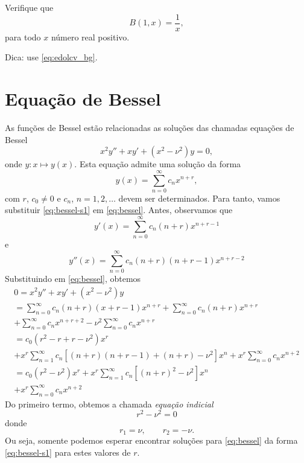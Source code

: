 \begin{exer}
  Verifique que
  \begin{equation}
    B(1,x) = \frac{1}{x},
  \end{equation}
  para todo $x$ número real positivo.
\end{exer}
\begin{resp}
  Dica: use \eqref{eq:edolcv_bg}.
\end{resp}

\section{Equação de Bessel}\label{cap_edolcv_sec_fbessel}

As funções de Bessel estão relacionadas as soluções das chamadas equações de Bessel
\begin{equation}\label{eq:bessel}
  x^2y'' + xy' + (x^2-\nu^2)y = 0,
\end{equation}
onde $y:x\mapsto y(x)$. Esta equação admite uma solução da forma
\begin{equation}\label{eq:bessel-s1}
  y(x) = \sum_{n=0}^\infty c_nx^{n+r},
\end{equation}
com $r$, $c_0\neq 0$ e $c_n$, $n=1,2,\ldots$ devem ser determinados. Para tanto, vamos substituir \eqref{eq:bessel-s1} em \eqref{eq:bessel}. Antes, observamos que
\begin{equation}
  y'(x) = \sum_{n=0}^\infty c_n(n+r)x^{n+r-1}
\end{equation}
e
\begin{equation}
  y''(x) = \sum_{n=0}^\infty c_n(n+r)(n+r-1)x^{n+r-2}
\end{equation}
Substituindo em \eqref{eq:bessel}, obtemos
\begin{gather}
  0 = x^2y'' + xy' + (x^2-\nu^2)y \\
  = \sum_{n=0}^\infty c_n(n+r)(x+r-1)x^{n+r} + \sum_{n=0}^\infty c_n(n+r)x^{n+r} \\
  + \sum_{n=0}^\infty c_nx^{n+r+2}- \nu^2\sum_{n=0}^\infty c_nx^{n+r}\\
  = c_0(r^2-r+r-\nu^2)x^r \\                              + x^r\sum_{n=1}^\infty c_n\left[(n+r)(n+r-1)+(n+r)-\nu^2\right]x^n+ x^r\sum_{n=0}^\infty c_nx^{n+2}\\
  = c_0(r^2-\nu^2)x^r + x^r\sum_{n=1}^\infty c_n\left[(n+r)^2-\nu^2\right]x^n \\
  + x^r\sum_{n=0}^\infty c_nx^{n+2}\label{eq:bessel-s2}
\end{gather}
Do primeiro termo, obtemos a chamada \emph{equação indicial}
\begin{equation}
  r^2 - \nu^2 = 0
\end{equation}
donde
\begin{equation}
  r_1 = \nu,\qquad r_2=-\nu.
\end{equation}
Ou seja, somente podemos esperar encontrar soluções para \eqref{eq:bessel} da forma \eqref{eq:bessel-s1} para estes valores de $r$.

